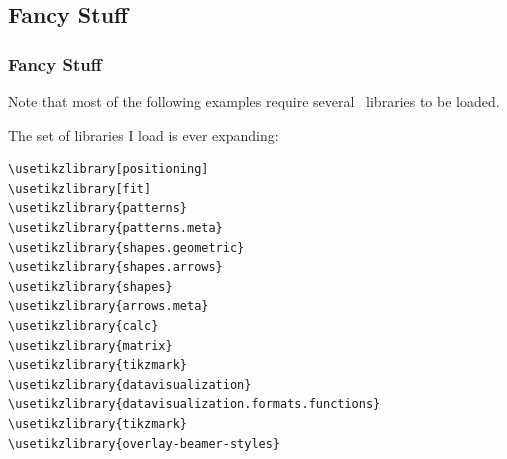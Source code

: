 \subsection{Fancy Stuff}
\begin{frame}[fragile]
  \frametitle{Fancy Stuff}
  \vspace{3mm}
  Note that most of the following examples require several \TikZ\ libraries to be loaded.
  
  \pause
  \vspace{5mm}
  The set of libraries I load is ever expanding:
  \pause
  \begin{verbatim}
\usetikzlibrary[positioning]
\usetikzlibrary[fit]
\usetikzlibrary{patterns}
\usetikzlibrary{patterns.meta}
\usetikzlibrary{shapes.geometric}
\usetikzlibrary{shapes.arrows}
\usetikzlibrary{shapes}
\usetikzlibrary{arrows.meta}
\usetikzlibrary{calc}
\usetikzlibrary{matrix}
\usetikzlibrary{tikzmark}
\usetikzlibrary{datavisualization}
\usetikzlibrary{datavisualization.formats.functions}
\usetikzlibrary{tikzmark}
\usetikzlibrary{overlay-beamer-styles}
  \end{verbatim}
\end{frame}

